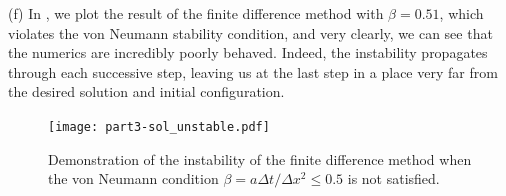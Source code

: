 {(f) In , we plot the result of the finite difference method with $\beta = 0.51$, which violates the von Neumann stability condition, and very clearly, we can see that the numerics are incredibly poorly behaved.
Indeed, the instability propagates through each successive step, leaving us at the last step in a place very far from the desired solution and initial configuration.

\begin{figure}[h!tb]
    \centering
    \texttt{[image: part3-sol\_unstable.pdf]}
    \caption{Demonstration of the instability of the finite difference method when the von Neumann condition $\beta = a \Delta t / \Delta x^2 \leq 0.5$ is not satisfied.}
    \label{fig:part3-sol-unstable}
\end{figure}




}


    


